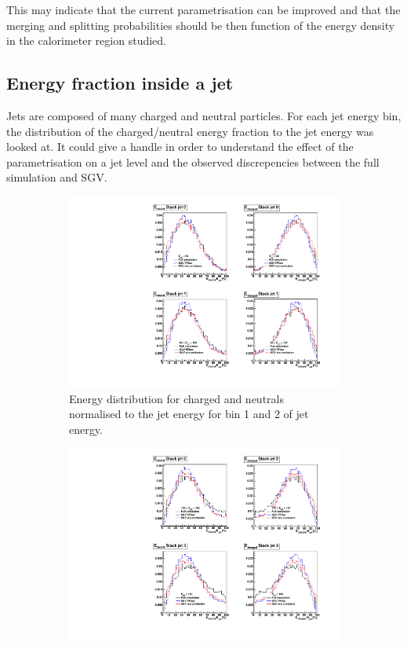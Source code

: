 This may indicate that the current parametrisation can be improved and that the merging and splitting probabilities should be then function of the energy density in the calorimeter region studied.

\subsection{Energy fraction inside a jet}

Jets are composed of many charged and neutral particles. For each jet energy bin, the distribution of the charged/neutral energy fraction to the jet energy was looked at. It could give a handle in order to understand the effect of the parametrisation on a jet level and the observed discrepencies between the full simulation and SGV.

\begin{figure}[t]
  \centering
  \begin{subfigure}[t]{0.45\textwidth}
    \centering
    \includegraphics[width=1\linewidth]{chap6/fig_SGV/EneuEcha_binned_1.pdf}
    \caption{Energy distribution for charged and neutrals normalised to the jet energy for bin 1 and 2 of jet energy.} \label{fig:jet_track_level_bins12}
  \end{subfigure}
  \hfill
  \begin{subfigure}[t]{0.45\textwidth}
    \centering
    \includegraphics[width=1\linewidth]{chap6/fig_SGV/EneuEcha_binned_2.pdf}

\end{subfigure}
\end{figure}
